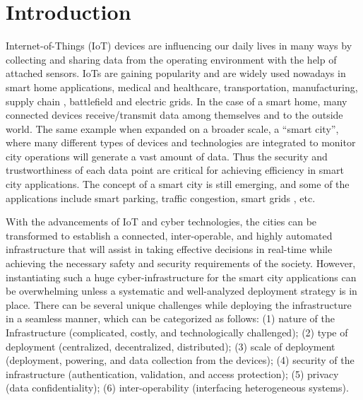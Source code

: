 \section{Introduction}
\label{sec:introduction}
Internet-of-Things (IoT) \cite{dorri_Blockchain_2017} devices are influencing our daily lives in many ways by collecting and sharing data from the operating environment with the help of attached sensors. IoTs are gaining popularity and are widely used nowadays in smart home applications, medical and healthcare, transportation, manufacturing, supply chain \cite{liangEDS}, battlefield \cite{toshIOBT} and electric grids. In the case of a smart home, many connected devices receive/transmit data among themselves and to the outside world. The same example when expanded on a broader scale, a ``smart city''\cite{chourabi_understanding_2012}, where many different types of devices and technologies are integrated to monitor city operations will generate a vast amount of data. Thus the security and trustworthiness of each data point are critical for achieving efficiency in smart city applications. The concept of a smart city is still emerging, and some of the applications include smart parking, traffic congestion, smart grids \cite{ghoshsmartgrid2016}\cite{ghosh2017security}\cite{ghosh2019security}, etc. 

With the advancements of IoT and cyber technologies, the cities can be transformed to establish a connected, inter-operable, and highly automated infrastructure that will assist in taking effective decisions in real-time while achieving the necessary safety and security requirements of the society. However, instantiating such a huge cyber-infrastructure for the smart city applications can be overwhelming unless a systematic and well-analyzed deployment strategy is in place. There can be several unique challenges while deploying the infrastructure in a seamless manner, which can be categorized as follows:
(1) nature of the Infrastructure (complicated, costly, and technologically challenged);
(2) type of deployment (centralized, decentralized, distributed);
(3) scale of deployment (deployment, powering, and data collection from the devices);
(4) security of the infrastructure (authentication, validation, and access protection); 
(5) privacy (data confidentiality);
(6) inter-operability (interfacing heterogeneous systems).

